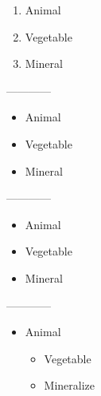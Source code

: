 \documentclass{article}
\begin{document}
\begin{enumerate}
    \item Animal
    \item Vegetable
    \item Mineral
\end{enumerate}
------------
\begin{itemize}
    \item Animal
    \item Vegetable
    \item Mineral
\end{itemize}
------------
\renewcommand{\labelitemi}{*}
\renewcommand{\labelitemii}{\dag}
\begin{itemize}
    \item Animal
    \item Vegetable
    \item Mineral
\end{itemize}
------------
\begin{itemize}
    \item Animal
    \begin{itemize}
        \item Vegetable
        \item Mineralize
    \end{itemize}
\end{itemize}
\end{document}

